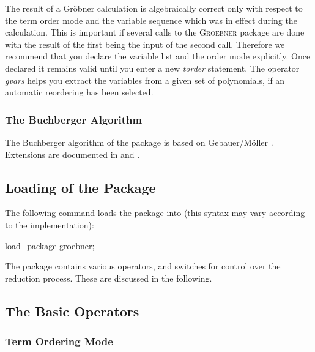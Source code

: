 The result of a Gr\"obner calculation is algebraically correct only
with respect to the term order mode and the variable sequence
which was in effect during the calculation. This is important if
several calls to the \textsc{Groebner} package are done with the result of the
first being the input of the second call. Therefore we recommend
that you declare the variable list and the order mode explicitly.
Once declared it remains valid until you enter a new \emph{torder}
statement. The operator \emph{gvars} helps you extract the variables
from a given set of polynomials, if an automatic reordering has been selected.

\subsubsection{The Buchberger Algorithm}
The Buchberger algorithm of the package is based on {\sc
Gebauer/M\"oller} \cite{Gebauer:88}.
Extensions are documented in \cite{Melenk:88} and \cite{Giovini:91}.

\subsection{Loading of the Package}
The following command loads the package into
\REDUCE (this syntax may vary according to the implementation):
\begin{center}
load\_package groebner;
\end{center}

The package contains various operators, and switches for control
over the reduction process. These are discussed in the following.

\subsection{The Basic Operators}

\subsubsection{Term Ordering Mode}

